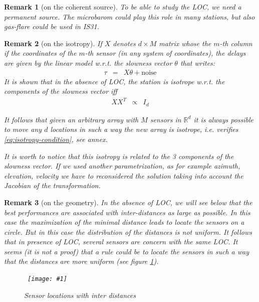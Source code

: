 \documentclass[a4paper, 12pt]{report}
\newcommand{\figscale}[4]{
\begin{figure}[hbtp]
\centerline{
    \hbox{ \texttt{[image: \#1]} }
}
\begin{center}
\parbox{14 cm}
{
    \caption{\protect\small\it  {#2}}
    \label {#3}
}
\end{center}

\end{figure}}
\newtheorem{remark}{Remark}
\begin{document}
\begin{remark}[on the coherent source]
To be able to study the LOC, we need a permanent source. The microbarom could play this role in many stations, but also gas-flare could be used in IS31.
\end{remark}

\begin{remark}[on the isotropy]
If $X$ denotes $d\times M$ matrix whose the $m$-th column if the coordinates of the $m$-th sensor (in any  system of coordinates), the delays are given by the linear model w.r.t. the slowness vector $\theta$ that writes:
\begin{eqnarray*}
 \tau &=& X\theta+\mathrm{noise}
\end{eqnarray*}
It is shown that in the absence of LOC, the station is isotrope w.r.t. the components of the slowness vector iff 
\begin{eqnarray}
 \label{eq:isotropy-condition}
XX^{T}&\propto&I_{d}
\end{eqnarray}

It follows that  given an arbitrary array with $M$ sensors in $\mathds{R}^{d}$ it is always possible to move any $d$ locations in such a way the new array is isotrope, i.e. verifies \eqref{eq:isotropy-condition}, see annex.

It is worth to notice that this isotropy is related to the 3 components of the slowness vector. If we used another parametrization, as for example azimuth, elevation, velocity we have to reconsidered the solution taking into account the Jacobian of the transformation.

\end{remark}

\begin{remark}[on the geometry]
In the absence of LOC, we will see below that the best performances are associated with inter-distances as large as possible. In this case the maximization of the minimal distance leads to locate the sensors on a circle. But in this case the distribution of the distances is not uniform. It follows that in presence of LOC, several sensors are concern with the same LOC. It seems (it is not a proof) that a rule could be to locate the sensors in such a way that the distances are more uniform (see figure \ref{fig:uniforinterdistances}).

\figscale{../figures/uniforinterdistances.pdf}{Sensor locations with inter distances}{fig:uniforinterdistances}{0.9}

\end{remark}
\end{document}
